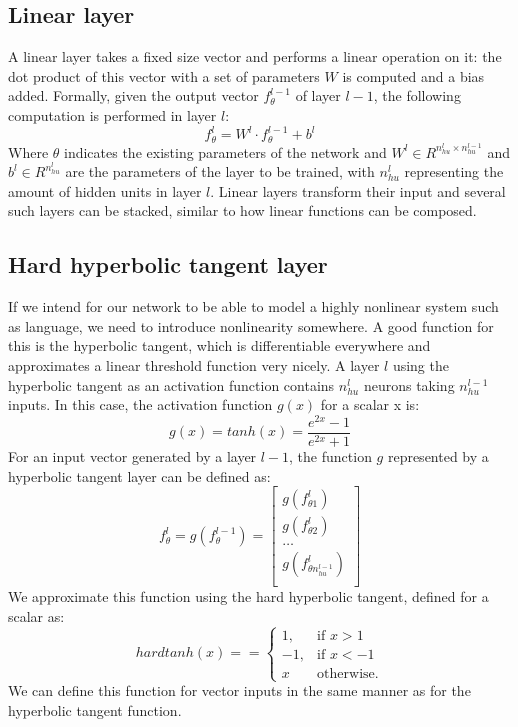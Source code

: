 \subsection{Linear layer}
A linear layer takes a fixed size vector and performs a linear
operation on it: the dot product of this vector with a set of
parameters $W$ is computed and a bias added. Formally, given the
output vector $f^{l-1}_\theta$ of layer $l-1$, the following
computation is performed in layer $l$:
\begin{equation}
  f^l_\theta = W^l \cdot f^{l-1}_\theta + b^l
\end{equation}
Where $\theta$ indicates the existing parameters of the network and
$W^l \in R^{n^l_{hu} \times n^{l-1}_{hu}} $ and $b^l \in R^{n^l_{hu}} $
are the parameters of the layer to be trained, with $n^l_{hu}$
representing the amount of hidden units in layer $l$. Linear layers
transform their input and several such layers can be stacked, similar
to how linear functions can be composed.

\subsection{Hard hyperbolic tangent layer}

If we intend for our network to be able to model a highly nonlinear
system such as language, we need to introduce nonlinearity
somewhere. A good function for this is the hyperbolic tangent, which
is differentiable everywhere and approximates a linear threshold
function very nicely. A layer $l$ using the hyperbolic tangent as an
activation function contains $n^l_{hu}$ neurons taking $n^{l-1}_{hu}$
inputs. In this case, the activation function $g(x)$ for a scalar x
is:
\begin{equation}
  g(x) = tanh(x) = \frac{e^{2x} - 1}{e^{2x} + 1}
\end{equation}
For an input vector generated by a layer $l - 1$, the function $g$ represented by a hyperbolic tangent layer can be defined as:
\begin{equation}
  f^l_{\theta} = g(f^{l-1}_{\theta})
  = \left[ \begin{array}{c}
      g(f^l_{\theta1}) \\
      g(f^l_{\theta2}) \\
      \ldots \\
      g(f^l_{\theta n^{l-1}_{hu}})\\ \end{array} \right]
\end{equation}
We approximate this function using the hard hyperbolic tangent, defined for a scalar as:
\begin{equation}
  hardtanh(x) = = \begin{cases} 1, & \mbox{if } x > 1 \\ -1, & \mbox{if } x < -1 \\ x & \mbox{otherwise.}\end{cases}
\end{equation}
We can define this function for vector inputs in the same manner
as for the hyperbolic tangent function.

